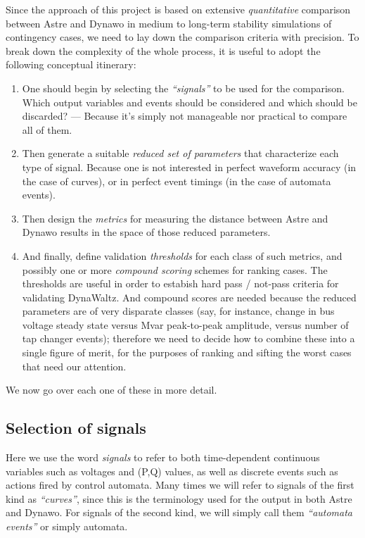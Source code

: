 \documentclass[11pt, a4paper, twoside, titlepage]{article}
\begin{document}
Since the approach of this project is based on extensive
\emph{quantitative} comparison between Astre and Dynawo in medium to
long-term stability simulations of contingency cases, we need to lay
down the comparison criteria with precision. To break down the
complexity of the whole process, it is useful to adopt the following
conceptual itinerary:
\begin{enumerate}
  \item One should begin by selecting the \emph{``signals''} to be
    used for the comparison. Which output variables and events should
    be considered and which should be discarded? --- Because it's simply
    not manageable nor practical to compare all of them.
  \item Then generate a suitable \emph{reduced set of parameters} that
    characterize each type of signal.  Because one is not interested
    in perfect waveform accuracy (in the case of curves), or in
    perfect event timings (in the case of automata events).
  \item Then design the \emph{metrics} for measuring the distance
    between Astre and Dynawo results in the space of those reduced
    parameters.
  \item And finally, define validation \emph{thresholds} for each
    class of such metrics, and possibly one or more \emph{compound
      scoring} schemes for ranking cases. The thresholds are useful in
    order to estabish hard pass / not-pass criteria for validating
    DynaWaltz. And compound scores are needed because the reduced
    parameters are of very disparate classes (say, for instance,
    change in bus voltage steady state versus Mvar peak-to-peak
    amplitude, versus number of tap changer events); therefore we need
    to decide how to combine these into a single figure of merit, for
    the purposes of ranking and sifting the worst cases that need our
    attention.
\end{enumerate}

We now go over each one of these in more detail.

\subsection{Selection of signals}

Here we use the word \emph{signals} to refer to both time-dependent continuous
variables such as voltages and (P,Q) values, as well as discrete events such as
actions fired by control automata.  Many times we will refer to signals of the
first kind as \emph{``curves''}, since this is the terminology used for the
output in both Astre and Dynawo. For signals of the second kind, we will simply
call them \emph{``automata events''} or simply automata.
\end{document}
